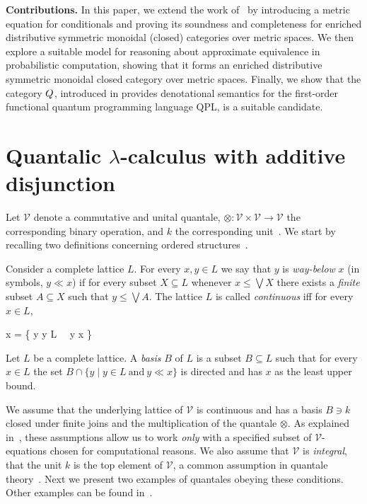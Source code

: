 \documentclass[a4paper,UKenglish,cleveref, autoref, thm-restate]{lipics-v2021}
\begin{document}
\noindent
\textbf{Contributions.}
In this paper, we extend the work of~\cite{dahlqvist2023syntactic} by introducing a metric equation for conditionals and proving its soundness and completeness for enriched distributive symmetric monoidal (closed) categories over metric spaces. We then explore a suitable model for reasoning about approximate equivalence in probabilistic computation, showing that it forms an enriched distributive symmetric monoidal closed category over metric spaces. Finally, we show that the category $\catQ$, introduced in \cite{selinger04} provides denotational semantics for the first-order functional quantum programming language QPL, is a suitable candidate.





\section{Quantalic $\lambda$-calculus with additive disjunction }

Let $\mathcal{V}$ denote a commutative and unital quantale, $\otimes :
\mathcal{V} \times \mathcal{V} \to \mathcal{V}$ the corresponding binary
operation, and $k$ the corresponding unit~\cite{paseka00}.  We start by
recalling two definitions concerning ordered
structures~\cite{gierz03,JGL-topology}. 

\begin{definition}
	Consider a complete lattice $L$.  For every $x, y \in L$ we say that
	$y$ is \emph{way-below} $x$ (in symbols, $y \ll x$) if for every
	subset $X \subseteq L$ whenever $x \leq \bigvee X$ there exists a
	\emph{finite} subset $A \subseteq X$ such that $y \leq \bigvee A$.
	The lattice $L$ is called \emph{continuous} iff for every $x \in L$,
	\begin{flalign*}
		x = \bigvee \{ y  \mid y \in L\  \ y \ll x \}
	\end{flalign*}
\end{definition}

\begin{definition}
	Let $L$ be a complete lattice. A \emph{basis} $B$ of $L$ is a subset
	$B \subseteq L$ such that for every $x \in L$ the set
	$B \cap \{ y \mid y \in L\ \text{and} \ y \ll x \}$ is directed and
	has $x$ as the least upper bound.
\end{definition}
We assume that the underlying lattice of $\mathcal{V}$ is continuous and has a
basis $B \ni k$ closed under finite joins and the multiplication of the
quantale $\otimes$. As explained in~\cite{dahlqvist22}, these assumptions allow
us to work \emph{only} with a specified subset of $\mathcal{V}$-equations
chosen \eg for computational reasons. We also assume that $\mathcal{V}$ is
\emph{integral}, \ie that the unit $k$ is the top element of $\mathcal{V}$, a
common assumption in quantale theory~\cite{velebil19}. Next we present two
examples of quantales obeying these conditions. Other examples can be found
in~\cite{dahlqvist22}.
\end{document}
